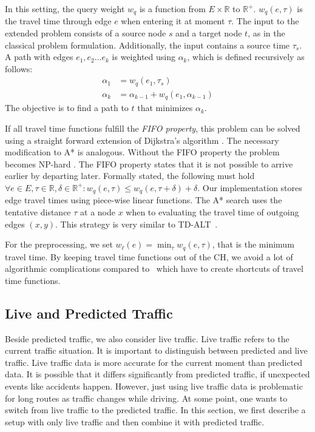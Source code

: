 \documentclass[a4paper,UKenglish,cleveref, autoref, thm-restate]{lipics-v2021}
\begin{document}
In this setting, the query weight $w_q$ is a function from $E\times \mathbb{R}$ to $\mathbb{R}^+$.
$w_q(e, \tau)$ is the travel time through edge $e$ when entering it at moment $\tau$.
The input to the extended problem consists of a source node $s$ and a target node $t$, as in the classical problem formulation.
Additionally, the input contains a source time $\tau_s$.
A path with edges $e_1,e_2\ldots e_k$ is weighted using $\alpha_k$, which is defined recursively as follows:\[
\begin{split}
\alpha_{1} & = w_q(e_1, \tau_s) \\
\alpha_{k} & = \alpha_{k-1} + w_q(e_1, \alpha_{k-1})
\end{split}
\]
The objective is to find a path to $t$ that minimizes $\alpha_k$.

If all travel time functions fulfill the \emph{FIFO property}, this problem can be solved using a straight forward extension of Dijkstra's algorithm \cite{d-aassp-69}.
The necessary modification to A* is analogous.
Without the FIFO property the problem becomes NP-hard \cite{or-tnp-89}.
The FIFO property states that it is not possible to arrive earlier by departing later.
Formally stated, the following must hold $\forall e\in E,\tau\in \mathbb{R},\delta\in \mathbb{R}^+: w_q(e, \tau) \le w_q(e, \tau+\delta) + \delta$.
Our implementation stores edge travel times using piece-wise linear functions.
The A* search uses the tentative distance $\tau$ at a node $x$ when to evaluating the travel time of outgoing edges $(x,y)$.
This strategy is very similar to TD-ALT~\cite{ndls-bastd-12,dw-lbrdg-07}.

For the preprocessing, we set $w_\ell(e) = \min_\tau w_q(e,\tau)$, that is the minimum travel time.
By keeping travel time functions out of the CH, we avoid a lot of algorithmic complications compared to~\cite{bgsv-mtdtt-13,bdpw-dtdrp-16,swz-sfert-20,dn-crdtd-12} which have to create shortcuts of travel time functions.

\subsection{Live and Predicted Traffic}
\label{sec:live-predicted-traffic}

Beside predicted traffic, we also consider live traffic.
Live traffic refers to the current traffic situation.
It is important to distinguish between predicted and live traffic.
Live traffic data is more accurate for the current moment than predicted data.
It is possible that it differs significantly from predicted traffic, if unexpected events like accidents happen.
However, just using live traffic data is problematic for long routes as traffic changes while driving.
At some point, one wants to switch from live traffic to the predicted traffic.
In this section, we first describe a setup with only live traffic and then combine it with predicted traffic.
\end{document}
